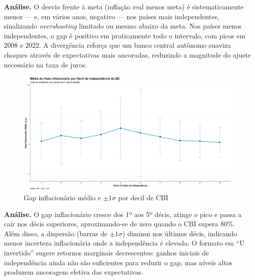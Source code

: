 \documentclass[a4paper,12pt]{article}[abnt2]
\begin{document}
\begin{flushleft}\small
\textbf{Análise.}
O desvio frente à meta (inflação real menos meta) é sistematicamente menor — e, em vários anos, negativo — nos países mais independentes, sinalizando \textit{overshooting} limitado ou mesmo abaixo da meta.  
Nos países menos independentes, o gap é positivo em praticamente todo o intervalo, com picos em 2008 e 2022.  
A divergência reforça que um banco central autônomo suaviza choques através de expectativas mais ancoradas, reduzindo a magnitude do ajuste necessário na taxa de juros.
\end{flushleft}

\begin{figure}[H]
    \centering
    \caption{Gap inflacionário médio e \(\pm1\sigma\) por decil de CBI}
    \label{fig:decil_gap}
    \includegraphics[width=.85\linewidth]{Imagens/an1i4.png}
\end{figure}

\begin{flushleft}\small
\textbf{Análise.}
O gap inflacionário cresce dos 1º aos 5º décis, atinge o pico e passa a cair nos décis superiores, aproximando‑se de zero quando o CBI supera 80\%.  
Além disso, a dispersão (barras de \(\pm1\sigma\)) diminui nos últimos décis, indicando menor incerteza inflacionária onde a independência é elevada.  
O formato em “U invertido” sugere retornos marginais decrescentes: ganhos iniciais de independência ainda não são suficientes para reduzir o gap, mas níveis altos produzem ancoragem efetiva das expectativas.
\end{flushleft}
\end{document}
